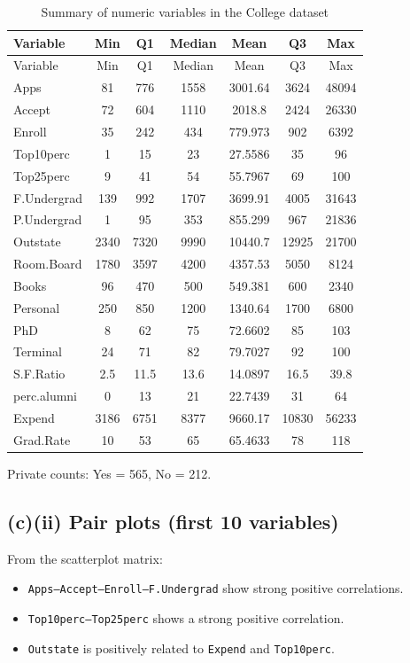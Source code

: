 \documentclass{article}
\begin{document}
\setlength{\tabcolsep}{4pt}
\begin{longtable}{l S S S S S S}
\caption{Summary of numeric variables in the College dataset}\label{tab:college-summary}\\
\toprule
Variable & {Min} & {Q1} & {Median} & {Mean} & {Q3} & {Max} \\
\midrule
\endfirsthead
\toprule
Variable & {Min} & {Q1} & {Median} & {Mean} & {Q3} & {Max} \\
\midrule
\endhead
Apps & 81 & 776 & 1558 & 3001.64 & 3624 & 48094 \\
Accept & 72 & 604 & 1110 & 2018.8 & 2424 & 26330 \\
Enroll & 35 & 242 & 434 & 779.973 & 902 & 6392 \\
Top10perc & 1 & 15 & 23 & 27.5586 & 35 & 96 \\
Top25perc & 9 & 41 & 54 & 55.7967 & 69 & 100 \\
F.Undergrad & 139 & 992 & 1707 & 3699.91 & 4005 & 31643 \\
P.Undergrad & 1 & 95 & 353 & 855.299 & 967 & 21836 \\
Outstate & 2340 & 7320 & 9990 & 10440.7 & 12925 & 21700 \\
Room.Board & 1780 & 3597 & 4200 & 4357.53 & 5050 & 8124 \\
Books & 96 & 470 & 500 & 549.381 & 600 & 2340 \\
Personal & 250 & 850 & 1200 & 1340.64 & 1700 & 6800 \\
PhD & 8 & 62 & 75 & 72.6602 & 85 & 103 \\
Terminal & 24 & 71 & 82 & 79.7027 & 92 & 100 \\
S.F.Ratio & 2.5 & 11.5 & 13.6 & 14.0897 & 16.5 & 39.8 \\
perc.alumni & 0 & 13 & 21 & 22.7439 & 31 & 64 \\
Expend & 3186 & 6751 & 8377 & 9660.17 & 10830 & 56233 \\
Grad.Rate & 10 & 53 & 65 & 65.4633 & 78 & 118 \\
\bottomrule
\end{longtable}

\noindent Private counts: Yes = 565, No = 212.

\subsection*{(c)(ii) Pair plots (first 10 variables)}
From the scatterplot matrix:
\begin{itemize}
  \item \texttt{Apps--Accept--Enroll--F.Undergrad} show strong positive correlations.
  \item \texttt{Top10perc--Top25perc} shows a strong positive correlation.
  \item \texttt{Outstate} is positively related to \texttt{Expend} and \texttt{Top10perc}.
\end{itemize}
\end{document}
